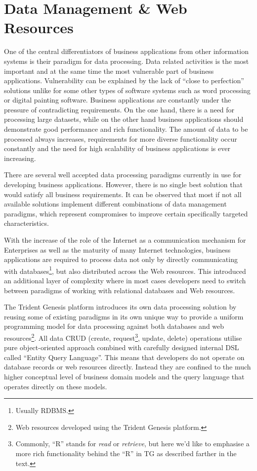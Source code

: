 \section{Data Management \& Web Resources}\label{sec:04}

  One of the central differentiators of business applications from other information systems is their paradigm for data processing.
  Data related activities is the most important and at the same time the most vulnerable part of business applications.
  Vulnerability can be explained by the lack of ``close to perfection'' solutions unlike for some other types of software systems such as word processing or digital painting software.
  Business applications are constantly under the pressure of contradicting requirements.
  On the one hand, there is a need for processing large datasets, while on the other hand business applications should demonstrate good performance and rich functionality.
  The amount of data to be processed always increases, requirements for more diverse functionality occur constantly and the need for high scalability of business applications is ever increasing.
  
  There are several well accepted data processing paradigms currently in use for developing business applications.
  However, there is no single best solution that would satisfy all business requirements.
  It can be observed that most if not all available solutions implement different combinations of data management paradigms, which represent compromises to improve certain specifically targeted characteristics.

  With the increase of the role of the Internet as a communication mechanism for Enterprises as well as the maturity of many Internet technologies, business applications are required to process data not only by directly communicating with databases\footnote{Usually RDBMS.}, but also distributed across the Web resources.
  This introduced an additional layer of complexity where in most cases developers need to switch between paradigms of working with relational databases and Web resources.

  The Trident Genesis platform introduces its own data processing solution by reusing some of existing paradigms in its own unique way to provide a uniform programming model for data processing against both databases and web resources\footnote{Web resources developed using the Trident Genesis platform.}.
  All data CRUD (create, request\footnote{Commonly, ``R'' stands for \emph{read} or \emph{retrieve}, but here we'd like to emphasise a more rich functionality behind the ``R'' in TG as described farther in the text.}, update, delete) operations utilise pure object-oriented approach combined with carefully designed internal DSL called ``Entity Query Language''.
  This means that developers do not operate on database records or web resources directly.
  Instead they are confined to the much higher conceptual level of business domain models and the query language that operates directly on these models.
  
